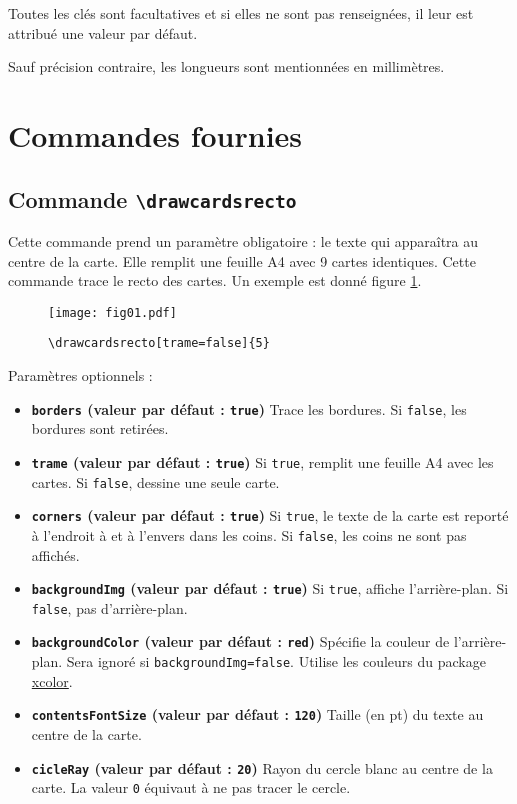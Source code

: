 \documentclass[a4paper, 12pt]{article}
\newcommand{\key}[3]{\textbf{\texttt{#1} (valeur par défaut : \texttt{#2})} #3}
\newcommand{\commande}[1]{\texttt{\textbackslash#1}}
\begin{document}
Toutes les clés sont facultatives et si elles ne sont pas renseignées, il leur est attribué une valeur par défaut.

Sauf précision contraire, les longueurs sont mentionnées en millimètres.

\section{Commandes fournies}
	\subsection{Commande \commande{drawcardsrecto}}
Cette commande prend un paramètre obligatoire : le texte qui apparaîtra au centre de la carte. Elle remplit une feuille A4 avec 9 cartes identiques. Cette commande trace le recto des cartes. Un exemple est donné figure \ref{fig:recto}.
\begin{figure}[h]\begin{center}
	\caption{\commande{drawcardsrecto[trame=false]\{5\}}}
	\texttt{[image: fig01.pdf]}\label{fig:recto}
\end{center}\end{figure}

Paramètres optionnels :
\begin{itemize}
	\item \key{borders}{true}{Trace les bordures. Si \texttt{false}, les bordures sont retirées.}
	\item \key{trame}{true}{Si \texttt{true}, remplit une feuille A4 avec les cartes. Si \texttt{false}, dessine une seule carte.}
	\item \key{corners}{true}{Si \texttt{true}, le texte de la carte est reporté à l'endroit à et à l'envers dans les coins. Si \texttt{false}, les coins ne sont pas affichés.}
	\item \key{backgroundImg}{true}{Si \texttt{true}, affiche l'arrière-plan. Si \texttt{false}, pas d'arrière-plan.}
	\item \key{backgroundColor}{red}{Spécifie la couleur de l'arrière-plan. Sera ignoré si \texttt{backgroundImg=false}. Utilise les couleurs du package \href{https://www.ctan.org/pkg/xcolor}{xcolor}.}
	\item \key{contentsFontSize}{120}{Taille (en pt) du texte au centre de la carte.}
	\item \key{cicleRay}{20}{Rayon du cercle blanc au centre de la carte. La valeur \texttt 0 équivaut à ne pas tracer le cercle.}
\end{itemize}
\end{document}

